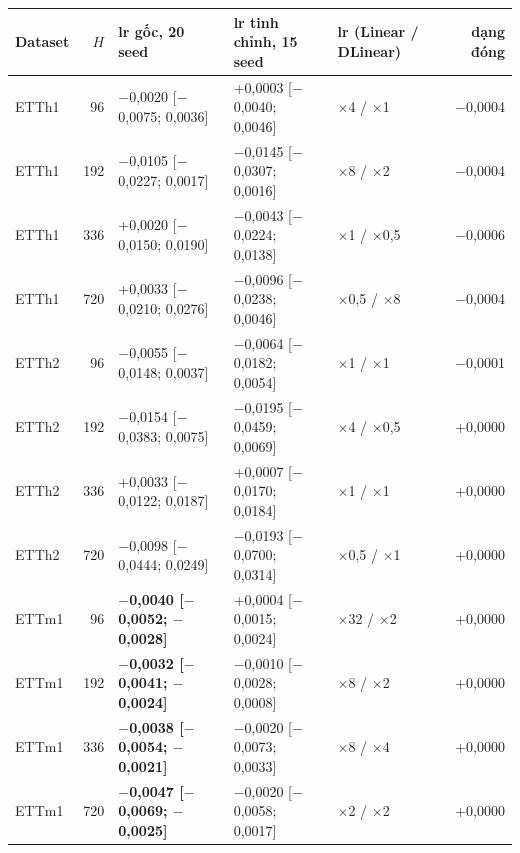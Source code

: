 \begin{tabular}{@{}lr l l l r@{}}
\toprule
Dataset & $H$ & lr gốc, 20 seed & lr tinh chỉnh, 15 seed & lr (Linear / DLinear) & dạng đóng \\
\midrule
ETTh1 & 96 & $-$0{,}0020 [$-$0{,}0075; 0{,}0036] & +0{,}0003 [$-$0{,}0040; 0{,}0046] & $\times$4 / $\times$1 & $-$0{,}0004 \\
ETTh1 & 192 & $-$0{,}0105 [$-$0{,}0227; 0{,}0017] & $-$0{,}0145 [$-$0{,}0307; 0{,}0016] & $\times$8 / $\times$2 & $-$0{,}0004 \\
ETTh1 & 336 & +0{,}0020 [$-$0{,}0150; 0{,}0190] & $-$0{,}0043 [$-$0{,}0224; 0{,}0138] & $\times$1 / $\times$0{,}5 & $-$0{,}0006 \\
ETTh1 & 720 & +0{,}0033 [$-$0{,}0210; 0{,}0276] & $-$0{,}0096 [$-$0{,}0238; 0{,}0046] & $\times$0{,}5 / $\times$8 & $-$0{,}0004 \\
\addlinespace[3pt]
ETTh2 & 96 & $-$0{,}0055 [$-$0{,}0148; 0{,}0037] & $-$0{,}0064 [$-$0{,}0182; 0{,}0054] & $\times$1 / $\times$1 & $-$0{,}0001 \\
ETTh2 & 192 & $-$0{,}0154 [$-$0{,}0383; 0{,}0075] & $-$0{,}0195 [$-$0{,}0459; 0{,}0069] & $\times$4 / $\times$0{,}5 & +0{,}0000 \\
ETTh2 & 336 & +0{,}0033 [$-$0{,}0122; 0{,}0187] & +0{,}0007 [$-$0{,}0170; 0{,}0184] & $\times$1 / $\times$1 & +0{,}0000 \\
ETTh2 & 720 & $-$0{,}0098 [$-$0{,}0444; 0{,}0249] & $-$0{,}0193 [$-$0{,}0700; 0{,}0314] & $\times$0{,}5 / $\times$1 & +0{,}0000 \\
\addlinespace[3pt]
ETTm1 & 96 & \textbf{$-$0{,}0040 [$-$0{,}0052; $-$0{,}0028]} & +0{,}0004 [$-$0{,}0015; 0{,}0024] & $\times$32 / $\times$2 & +0{,}0000 \\
ETTm1 & 192 & \textbf{$-$0{,}0032 [$-$0{,}0041; $-$0{,}0024]} & $-$0{,}0010 [$-$0{,}0028; 0{,}0008] & $\times$8 / $\times$2 & +0{,}0000 \\
ETTm1 & 336 & \textbf{$-$0{,}0038 [$-$0{,}0054; $-$0{,}0021]} & $-$0{,}0020 [$-$0{,}0073; 0{,}0033] & $\times$8 / $\times$4 & +0{,}0000 \\
ETTm1 & 720 & \textbf{$-$0{,}0047 [$-$0{,}0069; $-$0{,}0025]} & $-$0{,}0020 [$-$0{,}0058; 0{,}0017] & $\times$2 / $\times$2 & +0{,}0000 \\
\bottomrule
\end{tabular}
